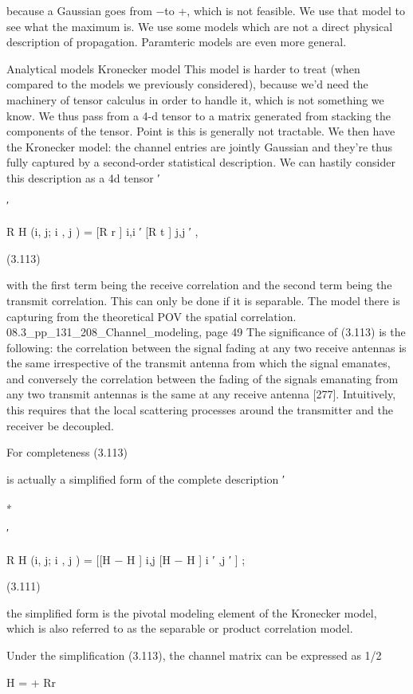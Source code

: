 {{{{because a Gaussian goes from −\infty to +\infty, which is not feasible. We use that model to see what the maximum is.
We use some models which are not a direct physical description of propagation.
Paramteric models are even more general.

Analytical models Kronecker model This model is harder to treat (when compared to the models we previously considered),
because we'd need the machinery of tensor calculus in order to handle it, which is not something we know.
We thus pass from a 4-d tensor to a matrix generated from stacking the components of the tensor. Point is this is generally not tractable.
We then have the Kronecker model: the channel entries are jointly Gaussian and they're thus fully captured by a second-order statistical description. We can hastily consider this description as a 4d tensor
′

′

R H (i, j; i , j ) = [R r ] i,i ′ [R t ] j,j ′ ,

(3.113)

with the first term being the receive correlation and the second term being the transmit correlation.
This can only be done if it is separable. The model there is capturing from the theoretical POV the spatial correlation.
08.3_pp_131_208_Channel_modeling, page 49 The significance of (3.113) is the following: the correlation between the signal fading at any two receive antennas is the same irrespective of the transmit antenna from which the signal emanates, and conversely the correlation between the fading of the signals emanating from any two transmit antennas is the same at any receive antenna [277]. Intuitively, this requires that the local scattering processes around the transmitter and the receiver be decoupled.

For completeness
(3.113)

is actually a simplified form of the complete description
′

∗

′

R H (i, j; i , j ) = [[H − \mu H ] i,j [H − \mu H ] i ′ ,j ′ ] ;

(3.111)

the simplified form is the pivotal modeling element of the Kronecker model, which is also referred to as the separable or product correlation model.

Under the simplification (3.113), the channel matrix can be expressed as 1/2

H = \muH + Rr

}}}}
